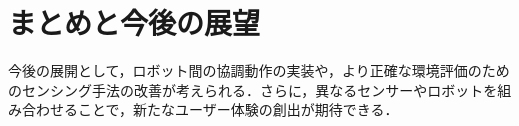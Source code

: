 \documentclass[paper=a4paper,jafontsize=9pt,head_space=15mm,gutter=20mm,
twocolumn,number_of_lines=49, line_length=26zw]{myuarticle}
\begin{document}
\section{まとめと今後の展望}%
今後の展開として，ロボット間の協調動作の実装や，より正確な環境評価のためのセンシング手法の改善が考えられる．さらに，異なるセンサーやロボットを組み合わせることで，新たなユーザー体験の創出が期待できる．



\renewcommand{\refname}{\normalsize 7.　　参考文献}
{
  \footnotesize
  
}

\end{document}
